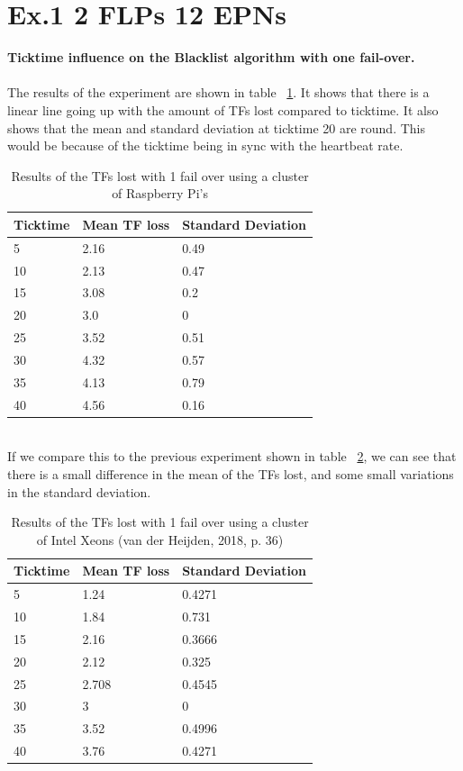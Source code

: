 \section{Ex.1 2 FLPs 12 EPNs}
\textbf{Ticktime influence on the Blacklist algorithm with one fail-over.}
\\~\\
The results of the experiment are shown in table ~\ref{table:Ex1MitchResults}. It shows that there is a linear line going up with the amount of TFs lost compared to ticktime. It also shows that the mean and standard deviation at ticktime 20 are round. This would be because of the ticktime being in sync with the heartbeat rate.

\begin{table}[h!]
\caption*{\textbf{Experiment one (2/12) using a cluster of Raspberry Pi's}}
\begin{tabular}{| l | l | l |}
\hline
Ticktime & Mean TF loss & Standard Deviation \\ \hline
5 & 2.16 & 0.49 \\ \hline
10 & 2.13 & 0.47 \\ \hline
15 & 3.08 & 0.2 \\ \hline
20 & 3.0 & 0 \\ \hline
25 & 3.52 & 0.51 \\ \hline
30 & 4.32 & 0.57 \\ \hline
35 & 4.13 & 0.79 \\ \hline
40 & 4.56 & 0.16 \\ \hline
\end{tabular}
\caption{Results of the TFs lost with 1 fail over using a cluster of Raspberry Pi's}
\label{table:Ex1MitchResults}
\end{table}

~\\ If we compare this to the previous experiment shown in table ~\ref{table:Ex1HeikoResults}, we can see that there is a small difference in the mean of the TFs lost, and some small variations in the standard deviation.

\begin{table}[h!]
\caption*{\textbf{Experiment one (2/12) using a cluster on Nikhef}}
\begin{tabular}{| l | l | l |}
\hline
Ticktime & Mean TF loss & Standard Deviation \\ \hline
5 & 1.24 & 0.4271 \\ \hline
10 & 1.84 & 0.731 \\ \hline
15 & 2.16 & 0.3666 \\ \hline
20 & 2.12 & 0.325 \\ \hline
25 & 2.708 & 0.4545 \\ \hline
30 & 3 & 0 \\ \hline
35 & 3.52 & 0.4996 \\ \hline
40 & 3.76 & 0.4271 \\ \hline
\end{tabular}
\caption{Results of the TFs lost with 1 fail over using a cluster of Intel Xeons (van der Heijden, 2018, p. 36)}
\label{table:Ex1HeikoResults}
\end{table}

